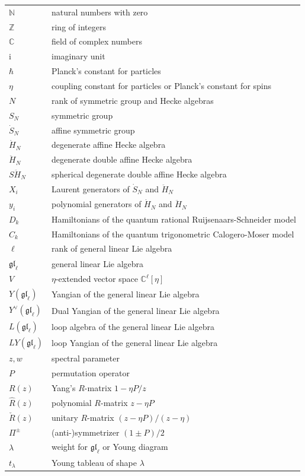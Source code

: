 \documentclass[11pt]{report}
\theoremstyle{definition}
\theoremstyle{remark}
\theoremstyle{remark}
\newcommand{\N}{\mathbb{N}}
\newcommand{\Z}{\mathbb{Z}}
\newcommand{\C}{\mathbb{C}}
\newcommand{\I}{\mathrm{i}}
\begin{document}
\begin{tabular}{l|l}
$\N$ & natural numbers with zero \\
$\Z$ & ring of integers \\
$\C$ & field of complex numbers \\
$\I$ & imaginary unit \\
$\hbar$ & Planck's constant for particles \\
$\eta$ & coupling constant for particles or Planck's constant for spins \\
$N$ & rank of symmetric group and Hecke algebras \\
$S_N$ & symmetric group \\
$\dot S_N$ & affine symmetric group \\
$\dot H_N$ & degenerate affine Hecke algebra \\
$\ddot H_N$ & degenerate double affine Hecke algebra \\
$S\ddot H_N$ & spherical degenerate double affine Hecke algebra \\
$X_i$ & Laurent generators of $\dot S_N$ and $\ddot H_N$ \\
$y_i$ & polynomial generators of $\dot H_N$ and $\ddot H_N$ \\
$D_k$ & Hamiltonians of the quantum rational Ruijsenaars-Schneider model \\
$C_k$ & Hamiltonians of the quantum trigonometric Calogero-Moser model \\
$\ell$ & rank of general linear Lie algebra \\
$\mathfrak{gl}_\ell$ & general linear Lie algebra \\
$V$ & $\eta$-extended vector space $\C^\ell[\eta]$ \\
$Y(\mathfrak{gl}_\ell)$ & Yangian of the general linear Lie algebra \\
$Y^\vee(\mathfrak{gl}_\ell)$ & Dual Yangian of the general linear Lie algebra \\
$L(\mathfrak{gl}_\ell)$ & loop algebra of the general linear Lie algebra \\
$LY(\mathfrak{gl}_\ell)$ & loop Yangian of the general linear Lie algebra \\
$z,w$ & spectral parameter \\
$P$ & permutation operator \\
$R(z)$ & Yang's $R$-matrix $1-\eta P/z$ \\
$\hat R(z)$ & polynomial $R$-matrix $z-\eta P$ \\
$\check R(z)$ & unitary $R$-matrix $(z-\eta P)/(z-\eta)$ \\
$\Pi^\pm$ & (anti-)symmetrizer $(1 \pm P)/2$ \\
$\lambda$ & weight for $\mathfrak{gl}_\ell$ or Young diagram \\
$t_\lambda$ & Young tableau of shape $\lambda$
\end{tabular}
\end{document}
